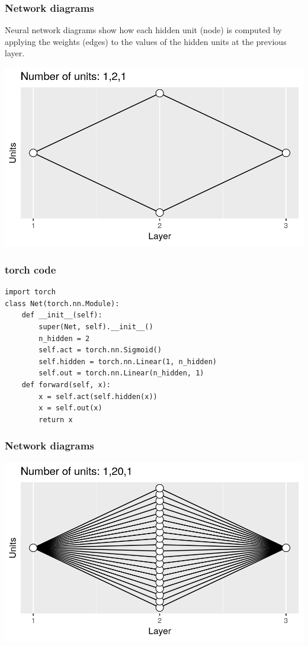 \documentclass{beamer}
\begin{document}
\begin{frame}
  \frametitle{Network diagrams}
Neural network diagrams show how each hidden unit (node) is computed by
applying the weights (edges) to the values of the hidden units at the previous
layer.

\includegraphics[width=\textwidth]{figure-architecture-reg2}
\end{frame}

\begin{frame}[fragile]
  \frametitle{torch code}
\begin{verbatim}
import torch
class Net(torch.nn.Module):
    def __init__(self):
        super(Net, self).__init__()
        n_hidden = 2
        self.act = torch.nn.Sigmoid()
        self.hidden = torch.nn.Linear(1, n_hidden)
        self.out = torch.nn.Linear(n_hidden, 1)
    def forward(self, x):
        x = self.act(self.hidden(x))
        x = self.out(x)
        return x
\end{verbatim}
\end{frame}

\begin{frame}
  \frametitle{Network diagrams}

\includegraphics[width=\textwidth]{figure-architecture-reg20}
\end{frame}
\end{document}
